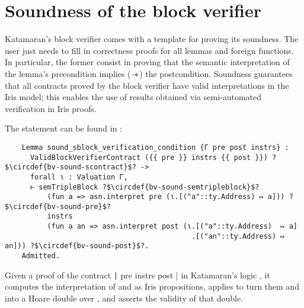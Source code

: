 

\section{Soundness of the block verifier}

Katamaran's block verifier comes with a template for proving its soundness. The user just needs to fill in correctness proofs for all lemmas and foreign functions. In particular, the former consist in proving that the semantic interpretation of the lemma's precondition implies (\(\mathrel{-\!\!\ast}\)) the postcondition. Soundness guarantees that all contracts proved by the block verifier have valid interpretations in the Iris model; this enables the use of results obtained via semi-automated verification in Iris proofs.

The statement can be found in : %
\startcstep
\begin{verbatim}
    Lemma sound_sblock_verification_condition {Γ pre post instrs} :
      ValidBlockVerifierContract ({{ pre }} instrs {{ post }}) ?$\circdef{bv-sound-scontract}$? ->
      forall ι : Valuation Γ,
      ⊢ semTripleBlock ?$\circdef{bv-sound-semtripleblock}$?
          (fun a => asn.interpret pre (ι.[("a"::ty.Address) ↦ a])) ?$\circdef{bv-sound-pre}$?
          instrs
          (fun a an => asn.interpret post (ι.[("a"::ty.Address)  ↦ a]
                                            .[("an"::ty.Address) ↦ an])) ?$\circdef{bv-sound-post}$?.
    Admitted.
\end{verbatim}
Given a proof of the contract \texttt|{{ pre }} instrs {{ post }}| in Katamaran's logic , it computes the interpretation of   and   as Iris propositions, applies   to turn them and  into a Hoare double over , and asserts the validity of that double.

